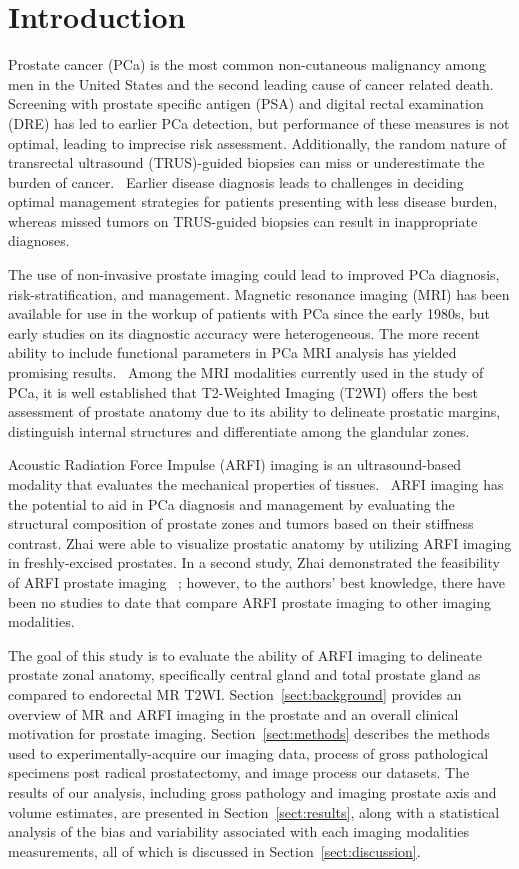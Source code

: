 \section{Introduction}\label{sect:intro}
Prostate cancer (PCa) is the most common non-cutaneous malignancy among men in
the United States and the second leading cause of cancer related
death.~\cite{Howlader2011} Screening with prostate specific antigen (PSA) and
digital rectal examination (DRE) has led to earlier PCa detection, but
performance of these measures is not optimal, leading to imprecise risk
assessment.  Additionally, the random nature of transrectal ultrasound
(TRUS)-guided biopsies can miss or underestimate the burden of
cancer.~\cite{Gupta2013} Earlier disease diagnosis leads to challenges in
deciding optimal management strategies for patients presenting with less
disease burden, whereas missed tumors on TRUS-guided biopsies can result in
inappropriate diagnoses. 

The use of non-invasive prostate imaging could lead to improved PCa diagnosis,
risk-stratification, and management.  Magnetic resonance imaging (MRI) has been
available for use in the workup of patients with PCa since the early 1980s, but
early studies on its diagnostic accuracy were heterogeneous.  The more
recent ability to include functional parameters in PCa MRI analysis has yielded
promising results.~\cite{Gupta2013,Hricak2007} Among the MRI modalities
currently used in the study of PCa, it is well established that T2-Weighted
Imaging (T2WI) offers the best assessment of prostate anatomy due to its
ability to delineate prostatic margins, distinguish internal structures and
differentiate among the glandular zones. 

Acoustic Radiation Force Impulse (ARFI) imaging is an ultrasound-based modality
that evaluates the mechanical properties of tissues.~\cite{Nightingale2002b}
ARFI imaging has the potential to aid in PCa diagnosis and management by
evaluating the structural composition of prostate zones and tumors based on
their stiffness contrast.  Zhai \etal were able to visualize prostatic anatomy
by utilizing ARFI imaging in freshly-excised prostates. In a second study, Zhai
\etal demonstrated the feasibility of ARFI prostate imaging
\invivo~\cite{Zhai2012}; however, to the authors’ best knowledge, there have
been no studies to date that compare \invivo ARFI prostate imaging to other
imaging modalities.~\cite{Zhai2010} 

The goal of this study is to evaluate the ability of ARFI imaging to delineate
prostate zonal anatomy, specifically central gland and total prostate gland
\invivo as compared to endorectal MR T2WI.  Section~\ref{sect:background}
provides an overview of MR and ARFI imaging in the prostate and an overall
clinical motivation for prostate imaging.  Section~\ref{sect:methods} describes
the methods used to experimentally-acquire our imaging data, process of gross
pathological specimens post radical prostatectomy, and image process our
datasets.  The results of our analysis, including gross pathology and imaging
prostate axis and volume estimates, are presented in
Section~\ref{sect:results}, along with a statistical analysis of the bias and
variability associated with each imaging modalities measurements, all of which
is discussed in Section~\ref{sect:discussion}.
